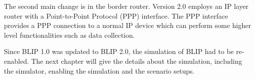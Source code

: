 The second main change is in the border router. Version 2.0 employs an IP layer router with a Point-to-Point Protocol (PPP) interface. The PPP interface provides a PPP connection to a normal IP device which can perform some higher level functionalities such as data collection.
\newline

Since BLIP 1.0 was updated to BLIP 2.0, the simulation of BLIP had to be re-enabled. The next chapter will give the details about the simulation, including the simulator, enabling the simulation and the scenario setups.

